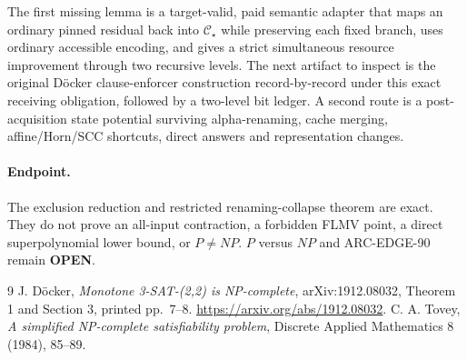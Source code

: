 \documentclass[11pt]{article}
\newcommand{\Cs}{\mathcal C_\star}
\begin{document}
The first missing lemma is a target-valid, paid semantic adapter that maps an
ordinary pinned residual back into $\Cs$ while preserving each fixed branch,
uses ordinary accessible encoding, and gives a strict simultaneous resource
improvement through two recursive levels.  The next artifact to inspect is the
original D\"ocker clause-enforcer construction record-by-record under this
exact receiving obligation, followed by a two-level bit ledger.  A second
route is a post-acquisition state potential surviving alpha-renaming, cache
merging, affine/Horn/SCC shortcuts, direct answers and representation changes.

\paragraph{Endpoint.}
The exclusion reduction and restricted renaming-collapse theorem are exact.
They do not prove an all-input contraction, a forbidden FLMV point, a direct
superpolynomial lower bound, or $P\ne NP$.  $P$ versus $NP$ and ARC-EDGE-90
remain \textbf{OPEN}.

\begin{thebibliography}{9}
J. D\"ocker, \emph{Monotone 3-SAT-(2,2) is NP-complete},
arXiv:1912.08032, Theorem 1 and Section 3, printed pp.~7--8.
\url{https://arxiv.org/abs/1912.08032}.
C. A. Tovey, \emph{A simplified NP-complete satisfiability problem},
Discrete Applied Mathematics 8 (1984), 85--89.
\end{thebibliography}
\end{document}
